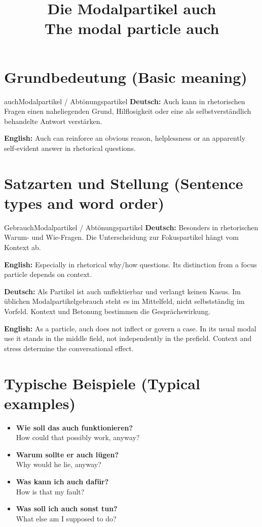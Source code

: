 \documentclass[a4paper,11pt]{article}
\title{Die Modalpartikel \glqq auch\grqq\\{\large\textnormal{The modal particle auch}}}
\date{}
\newcommand{\GermanText}[1]{\textbf{Deutsch: }#1\par}
\newcommand{\EnglishText}[1]{{\small\color{SoftGray}\textbf{English: }#1\par}}
\newcommand{\ExampleItem}[2]{\item \textbf{#1}\\{\small\color{SoftGray}#2}}
\begin{document}
\maketitle
\tableofcontents
\section{Grundbedeutung \textnormal{(Basic meaning)}}
\begin{grammarentry}{auch}{Modalpartikel / Abtönungspartikel}
\GermanText{Auch kann in rhetorischen Fragen einen naheliegenden Grund, Hilflosigkeit oder eine als selbstverständlich behandelte Antwort verstärken.}
\EnglishText{Auch can reinforce an obvious reason, helplessness or an apparently self-evident answer in rhetorical questions.}
\end{grammarentry}
\section{Satzarten und Stellung \textnormal{(Sentence types and word order)}}
\begin{grammarentry}{Gebrauch}{Modalpartikel / Abtönungspartikel}
\GermanText{Besonders in rhetorischen Warum- und Wie-Fragen. Die Unterscheidung zur Fokuspartikel hängt vom Kontext ab.}
\EnglishText{Especially in rhetorical why/how questions. Its distinction from a focus particle depends on context.}
\end{grammarentry}
\GermanText{Als Partikel ist auch unflektierbar und verlangt keinen Kasus. Im üblichen Modalpartikelgebrauch steht es im Mittelfeld, nicht selbstständig im Vorfeld. Kontext und Betonung bestimmen die Gesprächswirkung.}
\EnglishText{As a particle, auch does not inflect or govern a case. In its usual modal use it stands in the middle field, not independently in the prefield. Context and stress determine the conversational effect.}
\section{Typische Beispiele \textnormal{(Typical examples)}}
\begin{exbox}\begin{itemize}
\ExampleItem{Wie soll das auch funktionieren?}{How could that possibly work, anyway?}
\ExampleItem{Warum sollte er auch lügen?}{Why would he lie, anyway?}
\ExampleItem{Was kann ich auch dafür?}{How is that my fault?}
\ExampleItem{Was soll ich auch sonst tun?}{What else am I supposed to do?}
\end{itemize}\end{exbox}
\end{document}
